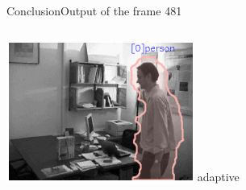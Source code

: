 \documentclass{beamer}
\begin{document}
\begin{frame}{Conclusion}{Output of the frame 481}
\begin{columns}
\begin{column}[t]{0.33\textwidth}
            \centering
            \includegraphics[width=\linewidth]{out481_adaptive.PNG}
            adaptive
        \end{column}
    \end{columns}
\end{frame}


        
\end{document}
